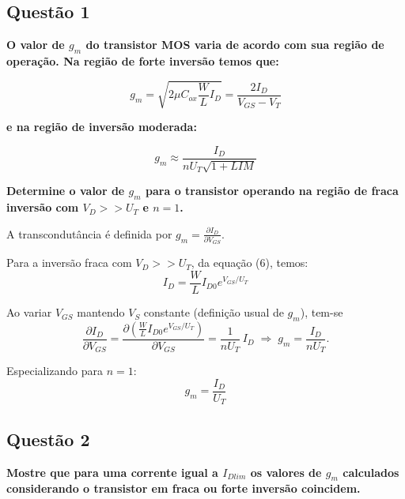 \documentclass[12pt,a4paper]{article}
\begin{document}
\subsection*{Questão 1}
\begin{BoxQ}
\textbf{O valor de $g_m$ do transistor MOS varia de acordo com sua região de operação. Na região de forte inversão temos que:}

\begin{equation}
    g_m = \sqrt{2\mu C_{ox} \frac{W}{L} I_D} = \frac{2I_D}{V_{GS} - V_T}
\end{equation}

\textbf{e na região de inversão moderada:}

\begin{equation}
    g_m \approx \frac{I_D}{nU_T \sqrt{1 +LIM}} 
\end{equation}

\textbf{Determine o valor de $g_m$ para o transistor operando na região de fraca inversão com $V_D >> U_T$ e $n = 1$.}
\end{BoxQ}\par

A transcondutância é definida por $g_m = \frac{\partial I_D}{\partial V_{GS}}$.

Para a inversão fraca com $V_D >> U_T$, da equação (6), temos:
\begin{equation*}
I_D = \frac{W}{L} I_{D0} e^{V_{GS}/U_T}
\end{equation*}

Ao variar $V_{GS}$ mantendo $V_S$ constante (definição usual de $g_m$), tem-se
\begin{equation*}
\frac{\partial I_D}{\partial V_{GS}} = \frac{\partial (\frac{W}{L} I_{D0} e^{V_{GS}/U_T})}{\partial V_{GS}} = \frac{1}{nU_T}\, I_D \;\Rightarrow\; g_m = \frac{I_D}{nU_T}.
\end{equation*}

Especializando para $n = 1$:
\begin{equation}
\boxed{g_m = \frac{I_D}{U_T}}
\end{equation}

\subsection*{Questão 2}
\begin{BoxQ}
\textbf{Mostre que para uma corrente igual a $I_{Dlim}$ os valores de $g_m$ calculados considerando o transistor em fraca ou forte inversão coincidem.}
\end{BoxQ}\par
\end{document}
